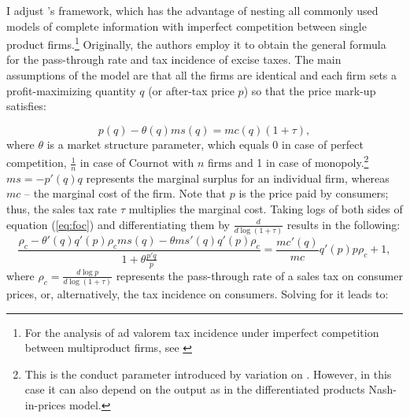 \documentclass[12pt]{article}
\begin{document}
I adjust \citet{fabinger}'s framework, which has the advantage of nesting all commonly used models of complete information with imperfect competition between single product firms.\footnote{For the analysis of ad valorem tax incidence under imperfect competition between multiproduct firms, see \citet{hamilton}} Originally, the authors employ it to obtain the general formula for the pass-through rate and tax incidence of excise taxes. 
The main assumptions of the model are that all the firms are identical and each firm sets a profit-maximizing quantity $q$ (or after-tax price $p$) so that the price mark-up satisfies:

\begin{equation}
\label{eq:foc}
p(q)-\theta(q) ms(q)=mc(q)(1+\tau),
\end{equation}
where $\theta$ is a market structure parameter, which equals 0 in case of perfect competition, $\frac{1}{n}$ in case of Cournot with $n$ firms and 1 in case of monopoly.\footnote{This is the conduct parameter introduced by  \citet{genesove} variation on \citet{bresnahan}. However, in this case it can also depend on the output as in 
	the differentiated products Nash-in-prices model.} $ms=-p'(q)q$ represents the marginal surplus for an individual firm, whereas $mc$ -- the marginal cost of the firm. Note that $p$ is the price paid by consumers; thus, the sales tax rate $\tau$ multiplies the marginal cost.  
Taking logs of both sides of equation (\ref{eq:foc}) and differentiating them by $\frac{d}{d\log (1+\tau)}$ results in the following:
\begin{equation}
\frac{\rho_c -\theta'(q)q'(p)\rho_c ms(q)-\theta ms'(q)q'(p)\rho_c }{1+\theta\frac{p'q}{p}}= 
\frac{mc'(q)}{mc}q'(p)p\rho_c+1,
\end{equation}
where $\rho_c=\frac{d\log p}{d\log(1+\tau)}$ represents the pass-through rate of a sales tax on consumer prices, or, alternatively, the tax incidence on consumers. Solving for it leads to:
\end{document}
